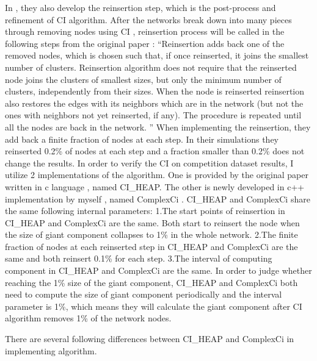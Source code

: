 \documentclass{article}
\begin{document}
	In \cite{morone2015influence} \cite{morone2016collective}, they also develop the reinsertion step, which is the post-process and  refinement of CI algorithm. After the networks break down into many pieces through removing nodes using CI , reinsertion process will be called in the following steps from the original paper \cite{morone2016collective} : 
	“Reinsertion adds back one of the removed nodes, which is chosen such that, if once reinserted, it joins the smallest number of clusters. Reinsertion algorithm does not require that the reinserted node joins the clusters of smallest sizes, but only the minimum number of clusters, independently from their sizes. When the node is reinserted reinsertion also restores the edges with its neighbors which are in the network (but not the ones with neighbors not yet reinserted, if any). The procedure is repeated until all the nodes are back in the network. ” 
	When implementing the reinsertion, they add back a finite fraction of nodes at each step. In their simulations they reinserted 0.2\% of nodes at each step and a fraction smaller than 0.2\% does not change the results.
	In order to verify the CI on competition dataset results, I utilize 2 implementations of the algorithm. One is provided by the original paper written in c language \cite{ciheapccode}, named CI\_HEAP. The other is newly developed in c++ implementation by myself \cite{zhfkt2017887989} \cite{zhfktgithub}, named ComplexCi . 
	CI\_HEAP and ComplexCi share the same following internal parameters:
	1.The start points of reinsertion in CI\_HEAP and ComplexCi are the same. Both start to reinsert the node when the size of giant component collapses to 1\% in the whole network.
	2.The finite fraction of nodes at each reinserted step in CI\_HEAP and ComplexCi are the same and both reinsert 0.1\% for each step.
	3.The interval of computing component in CI\_HEAP and ComplexCi are the same. In order to judge whether reaching the 1\% size of the giant component, CI\_HEAP and ComplexCi both need to compute the size of giant component periodically and the interval parameter is 1\%, which means they will calculate the giant component after CI algorithm removes 1\% of the network nodes.
	
	There are several following differences between CI\_HEAP and ComplexCi in implementing algorithm.
	
\end{document}
